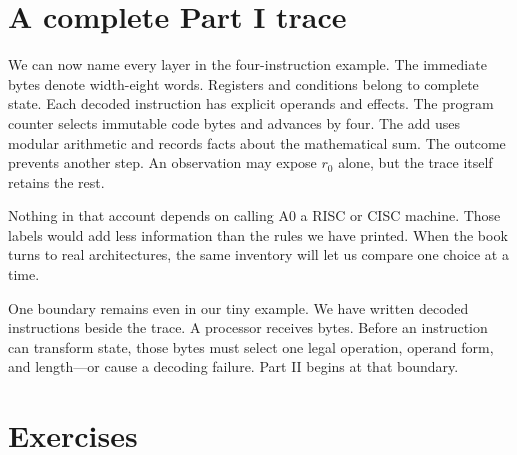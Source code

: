 \section{A complete Part I trace}

We can now name every layer in the four-instruction example. The immediate
bytes denote width-eight words. Registers and conditions belong to complete
state. Each decoded instruction has explicit operands and effects. The
program counter selects immutable code bytes and advances by four. The add
uses modular arithmetic and records facts about the mathematical sum. The
 outcome prevents another step. An observation may expose \(r_0\)
alone, but the trace itself retains the rest.

Nothing in that account depends on calling A0 a RISC or CISC machine. Those
labels would add less information than the rules we have printed. When the
book turns to real architectures, the same inventory will let us compare one
choice at a time.

One boundary remains even in our tiny example. We have written decoded
instructions beside the trace. A processor receives bytes. Before an
instruction can transform state, those bytes must select one legal operation,
operand form, and length---or cause a decoding failure. Part II begins at that
boundary.

\section{Exercises}

